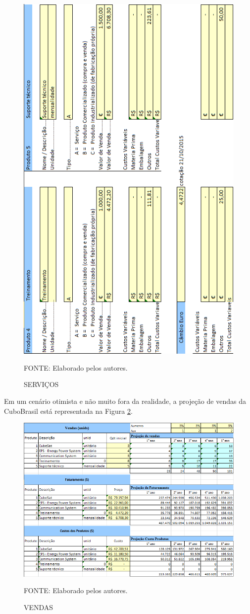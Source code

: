 \documentclass[
	12pt,				%
	openright,			%
	oneside,			%
	a4paper,			%
	english,			%
	french,				%
	spanish,			%
	brazil				%
	]{abntex2}
\begin{document}
	\begin{figure}[th]
		\caption{SERVIÇOS}
		\label{produto2}
		\centering
		\includegraphics[width=0.6\linewidth]{./figs/produto2}
		
		\begin{small}
			FONTE: Elaborado pelos autores.
		\end{small}
	\end{figure}
	\pagebreak
	
	Em um cenário otimista e não muito fora da realidade, a projeção de vendas da CuboBrasil está representada na Figura \ref{vendas}.
	
	\begin{figure}[th]
		\caption{VENDAS}
		\label{vendas}
		\centering
		\includegraphics[width=0.8\linewidth]{./figs/vendas}
		
		\begin{small}
			FONTE: Elaborado pelos autores.
		\end{small}
	\end{figure}
	\pagebreak
	
\end{document}
